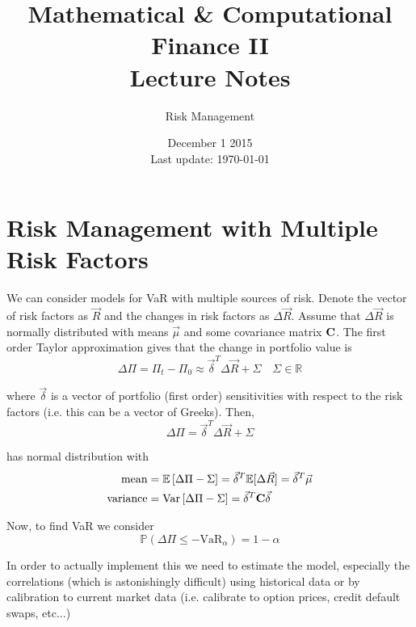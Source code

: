 \documentclass[12pt]{article}
\newlength\tindent
\renewcommand{\indent}{\hspace*{\tindent}}
\newcommand{\R}{\mathbb R}
\renewcommand{\P}{\mathbb P}
\newcommand{\E}{\mathbb E}
\newcommand{\var}{\mathrm{Var}}
\begin{document}
 
 
\title{Mathematical \& Computational Finance II\\Lecture Notes}
\author{Risk Management}
\date{December 1 2015 \\ Last update: \today{}}
\maketitle

\section{Risk Management with Multiple Risk Factors}

\indent We can consider models for VaR with multiple sources of risk. Denote the vector of risk factors as $\vec{R}$ and the changes in risk factors as $\Delta \vec{R}$. Assume that $\Delta \vec{R}$ is normally distributed with means $\vec{\mu}$ and some covariance matrix ${\bf C}$. The first order Taylor approximation gives that the change in portfolio value is
\begin{equation*}
	\Delta \Pi = \Pi_t - \Pi_0 \approx \vec{\delta}^T\Delta\vec{R} + \Sigma \quad \Sigma \in \R
\end{equation*}

where $\vec{\delta}$ is a vector of portfolio (first order) sensitivities with respect to the risk factors (i.e. this can be a vector of Greeks). Then,
\begin{equation*}
	\Delta \Pi = \vec{\delta}^T \Delta \vec{R} + \Sigma
\end{equation*}

has normal distribution with 
\begin{align*}
	\text{mean} &= \E \left[ \Delta \Pi - \Sigma \right] = \vec{\delta}^T \E [\Delta \vec{R}] = \vec{\delta}^T \vec{\mu}  \\
	\text{variance} &= \var \left[ \Delta \Pi - \Sigma \right] = \vec{\delta}^T {\bf C} \vec{\delta}
\end{align*}

Now, to find VaR we consider
\begin{equation*}
	\P (\Delta \Pi \leq -\text{VaR}_\alpha) = 1 - \alpha
\end{equation*}

\indent In order to actually implement this we need to estimate the model, especially the correlations (which is astonishingly difficult) using historical data or by calibration to current market data (i.e. calibrate to option prices, credit default swaps, etc...)
\end{document}
